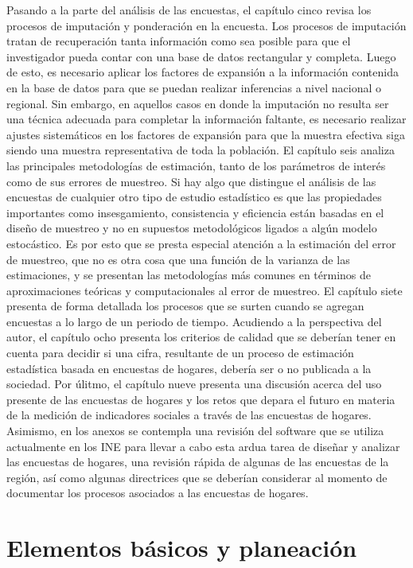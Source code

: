 \documentclass[12pt,spanish,]{book}
\begin{document}
Pasando a la parte del análisis de las encuestas, el capítulo cinco revisa los procesos de imputación y ponderación en la encuesta. Los procesos de imputación tratan de recuperación tanta información como sea posible para que el investigador pueda contar con una base de datos rectangular y completa. Luego de esto, es necesario aplicar los factores de expansión a la información contenida en la base de datos para que se puedan realizar inferencias a nivel nacional o regional. Sin embargo, en aquellos casos en donde la imputación no resulta ser una técnica adecuada para completar la información faltante, es necesario realizar ajustes sistemáticos en los factores de expansión para que la muestra efectiva siga siendo una muestra representativa de toda la población. El capítulo seis analiza las principales metodologías de estimación, tanto de los parámetros de interés como de sus errores de muestreo. Si hay algo que distingue el análisis de las encuestas de cualquier otro tipo de estudio estadístico es que las propiedades importantes como insesgamiento, consistencia y eficiencia están basadas en el diseño de muestreo y no en supuestos metodológicos ligados a algún modelo estocástico. Es por esto que se presta especial atención a la estimación del error de muestreo, que no es otra cosa que una función de la varianza de las estimaciones, y se presentan las metodologías más comunes en términos de aproximaciones teóricas y computacionales al error de muestreo. El capítulo siete presenta de forma detallada los procesos que se surten cuando se agregan encuestas a lo largo de un periodo de tiempo. Acudiendo a la perspectiva del autor, el capítulo ocho presenta los criterios de calidad que se deberían tener en cuenta para decidir si una cifra, resultante de un proceso de estimación estadística basada en encuestas de hogares, debería ser o no publicada a la sociedad. Por úlitmo, el capítulo nueve presenta una discusión acerca del uso presente de las encuestas de hogares y los retos que depara el futuro en materia de la medición de indicadores sociales a través de las encuestas de hogares. Asimismo, en los anexos se contempla una revisión del software que se utiliza actualmente en los INE para llevar a cabo esta ardua tarea de diseñar y analizar las encuestas de hogares, una revisión rápida de algunas de las encuestas de la región, así como algunas directrices que se deberían considerar al momento de documentar los procesos asociados a las encuestas de hogares.

\hypertarget{elementos-basicos-y-planeacion}{%
\chapter{Elementos básicos y planeación}\label{elementos-basicos-y-planeacion}}
\end{document}
